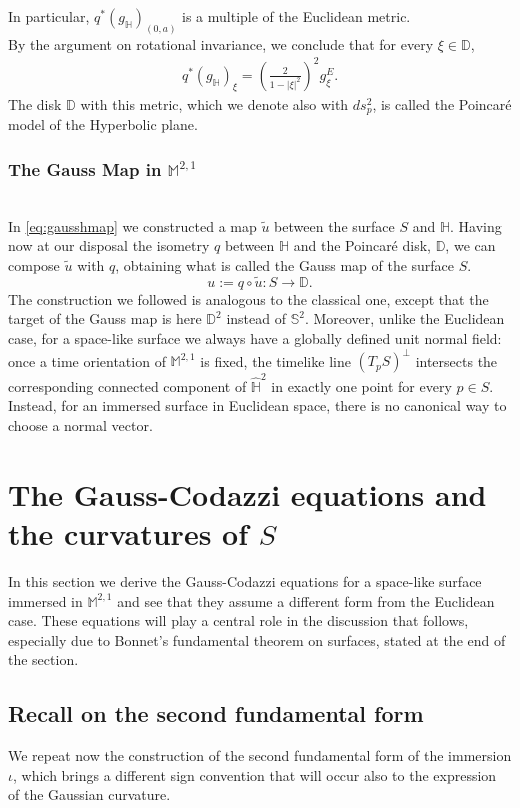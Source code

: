 \documentclass[a4paper,11pt,openright,twoside]{book}
\newcommand{\M}{\mathbb{M}^{2,1}}
\newcommand{\1}{\mathds{1}}
\theoremstyle{plain}
\theoremstyle{definition}
\theoremstyle{remark}
\begin{document}
In particular, $q^*(g_{\mathbb H})_{(0,a)}$ is a multiple of the Euclidean metric.\\
By the argument on rotational invariance, we conclude that for every $\xi\in \mathbb{D}$,
\begin{align*}
	q^*(g_\mathbb{H})_\xi
	=
	\left(\frac{2}{1-|\xi|^2}\right)^2 g^E_\xi.
\end{align*}
The disk $\mathbb{D}$ with this metric, which we denote also with $ds_p^2$, is called the Poincaré model of the Hyperbolic plane.\\
\subsection{The Gauss Map in $\M$}\mbox{}\\
In \eqref{eq:gausshmap} we constructed a map $\tilde u$ between the surface $S$ and $\mathbb{H}$. Having now at our disposal the isometry $q$ between $\mathbb{H}$ and the Poincaré disk, $\mathbb{D}$, we can compose $\tilde u$ with $q$, obtaining what is called the Gauss map of the surface $S$. 
\[ u := q \circ \tilde u:S\to \mathbb{D}. \]
The construction we followed is analogous to the classical one, except that the target of the Gauss map is here $\mathbb{D}^2$ instead of $\mathbb{S}^2$. Moreover, unlike the Euclidean case, for a space-like surface we always have a globally defined unit normal field: once a time orientation of $\M$ is fixed, the timelike line $(T_pS)^\perp$ intersects the corresponding connected component of $\hat{\mathbb{H}}^2$ in exactly one point for every $p\in S$. Instead, for an immersed surface in Euclidean space, there is no canonical way to choose a normal vector.\\

\chapter{The Gauss-Codazzi equations and the curvatures of $S$}
In this section we derive the Gauss-Codazzi equations for a space-like surface immersed in $\M$ and see that they assume a different form from the Euclidean case. These equations will play a central role in the discussion that follows, especially due to Bonnet's fundamental theorem on surfaces, stated at the end of the section.
\section{Recall on the second fundamental form}
We repeat now the construction of the second fundamental form of the immersion $\iota$, which brings a different sign convention that will occur also to the expression of the Gaussian curvature.\\
\end{document}
